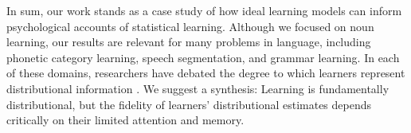 \documentclass[man,floatsintext]{apa6}
\begin{document}
In sum, our work stands as a case study of how ideal learning models can inform psychological accounts of statistical learning. Although we focused on noun learning, our results are relevant for many problems in language, including phonetic category learning, speech segmentation, and grammar learning. In each of these domains, researchers have debated the degree to which learners represent distributional information \cite{Endress2005, Frank2010a, McMurray2013}. We suggest a synthesis: Learning is fundamentally distributional, but the fidelity of learners' distributional estimates depends critically on their limited attention and memory.
%
%



\end{document}
